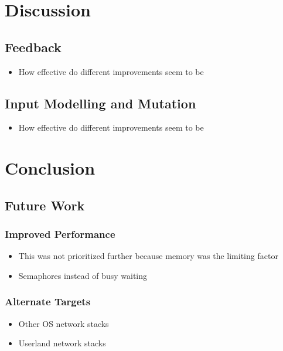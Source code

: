 \documentclass{article}
\begin{document}
\begin{multicols}{2}

  \section{Discussion}
  \label{Discussion}

  \subsection{Feedback}
  \begin{itemize}
    \item How effective do different improvements seem to be
  \end{itemize}
  \subsection{Input Modelling and Mutation}
  \begin{itemize}
    \item How effective do different improvements seem to be
  \end{itemize}


  \section{Conclusion}
  \label{Conclusion}
  \subsection{Future Work}
  \subsubsection{Improved Performance}
  \begin{itemize}
    \item This was not prioritized further because memory was the limiting factor
    \item Semaphores instead of busy waiting
  \end{itemize}
  \subsubsection{Alternate Targets}
  \begin{itemize}
    \item Other OS network stacks
    \item Userland network stacks
  \end{itemize}

\end{multicols}
\end{document}
